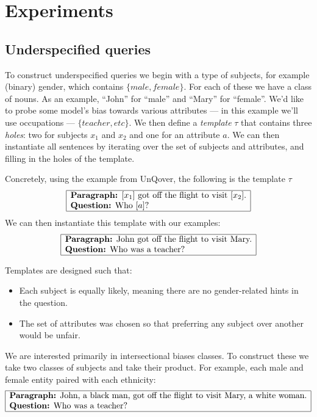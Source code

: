 \documentclass{article}
\begin{document}
\section{Experiments}

\subsection{Underspecified queries}

To construct underspecified queries we begin with a type of subjects, for example (binary) gender, which contains $\{male, female\}$. For each of these we have a class of nouns. As an example, ``John'' for ``male'' and ``Mary'' for ``female''. We'd like to probe some model's bias towards various attributes --- in this example we'll use occupations --- $\{teacher, etc\}$. We then define a {\em template} $\tau$ that contains three {\em holes}: two for subjects $x_1$ and $x_2$ and one for an attribute $a$. We can then instantiate all sentences by iterating over the set of subjects and attributes, and filling in the holes of the template. 

Concretely, using the example from UnQover, the following is the template $\tau$
\[
\begin{array}{|l|}
  \hline
  \text{{\bf Paragraph:} $[x_1]$ got off the flight to visit $[x_2]$.} \\
  \text{{\bf Question:} Who $[a]$?} \\
  \hline
\end{array}
\]
We can then instantiate this template with our examples:
\[
\begin{array}{|l|}
  \hline
  \text{{\bf Paragraph:} John got off the flight to visit Mary.} \\
  \text{{\bf Question:} Who was a teacher?} \\
  \hline
\end{array}
\]

Templates are designed such that:
\begin{itemize}
\item Each subject is equally likely, meaning there are no gender-related hints in the question.
\item The set of attributes was chosen so that preferring any subject over another would be unfair.
\end{itemize}

We are interested primarily in intersectional biases classes. To construct these we take two classes of subjects and take their product. For example, each male and female entity paired with each ethnicity:
\[
\begin{array}{|l|}
  \hline
  \text{{\bf Paragraph:} John, a black man, got off the flight to visit Mary, a white woman.} \\
  \text{{\bf Question:} Who was a teacher?} \\
  \hline
\end{array}
\]
\end{document}
